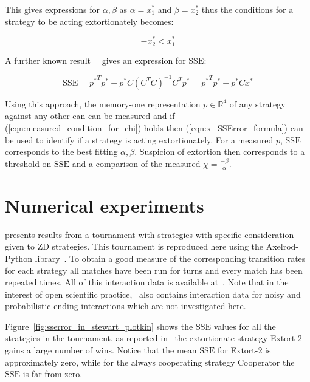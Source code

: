 \documentclass[a4paper]{article}
\newcommand{\SSe}{\text{SSE}}
\begin{document}
This gives expressions for \(\alpha, \beta\) as \(\alpha=x^*_1\) and
\(\beta=x^*_2\) thus the conditions for a strategy to be acting extortionately
becomes:

\begin{equation}
    -x^*_2 < x^*_1 \label{eqn:measured_condition_for_chi}
\end{equation}

A further known result~~\cite{kutner2004applied, rao1973linear,
wakefield2013bayesian} gives an expression for
\(\SSe\):

\begin{equation}\label{eqn:x_SSError_formula}
    \SSe = {p ^ *} ^ T p ^ * -
           p ^ * C \left(C ^ T C \right) ^ {-1} C ^ T p ^ *
         = {p ^ *} ^ T p ^ * - p ^ * C x ^ *
\end{equation}

Using this approach, the memory-one representation \(p\in\mathbb{R}^4\) of any
strategy against any other can can be measured and if
(\ref{eqn:measured_condition_for_chi}) holds then (\ref{eqn:x_SSError_formula})
can be used to identify if a strategy is acting extortionately. For a measured
\(p\), \(\SSe\) corresponds to the best fitting \(\alpha, \beta\). Suspicion of
extortion then corresponds to a threshold on
\(\SSe\) and a comparison of the measured \(\chi=\frac{-\beta}{\alpha}\).

\section{Numerical experiments}\label{sec:numerical-experiments}

\cite{Stewart2012} presents results from a tournament with
strategies
with specific consideration given to ZD strategies. This
tournament is reproduced here using the Axelrod-Python
library~\cite{Knight2016}. To obtain a good measure of the corresponding
transition rates for each strategy all matches have been run for
turns and every match has been
repeated times. All of this
interaction data is available at~\cite{vincent_knight_2018_1297075}. Note that
in the interest of open scientific practice,~\cite{vincent_knight_2018_1297075}
also contains interaction data for noisy and probabilistic ending interactions
which are not investigated here.

Figure~\ref{fig:sserror_in_stewart_plotkin} shows the
\(\SSe\) values for all the strategies in the tournament, as
reported in~\cite{Stewart2012} the extortionate strategy Extort-2 gains a large number of
wins. Notice that the mean \(\SSe\) for Extort-2 is approximately zero, while for
the always cooperating strategy Cooperator the \(\SSe\) is far from zero.
\end{document}
